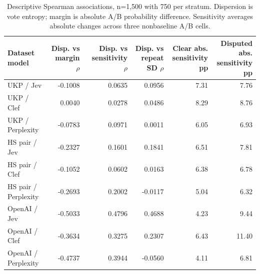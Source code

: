 \begin{table}[t]
\centering\footnotesize
\setlength{\tabcolsep}{3.5pt}
\begin{tabular}{@{}lrrrrr@{}}
\toprule
\shortstack[l]{Dataset\\{}model} & \shortstack[l]{Disp. vs\\{}margin $\rho$} & \shortstack[l]{Disp. vs\\{}sensitivity $\rho$} & \shortstack[l]{Disp. vs\\{}repeat SD $\rho$} & \shortstack[l]{Clear abs.\\{}sensitivity pp} & \shortstack[l]{Disputed abs.\\{}sensitivity pp} \\
\midrule
UKP / Jev & -0.1008 & 0.0635 & 0.0956 & 7.31 & 7.76 \\
UKP / Clef & 0.0040 & 0.0278 & 0.0486 & 8.29 & 8.76 \\
UKP / Perplexity & -0.0783 & 0.0971 & 0.0011 & 6.05 & 6.93 \\
HS pair / Jev & -0.2327 & 0.1601 & 0.1841 & 6.51 & 7.81 \\
HS pair / Clef & -0.1052 & 0.0602 & 0.0163 & 6.38 & 6.78 \\
HS pair / Perplexity & -0.2693 & 0.2002 & -0.0117 & 5.04 & 6.32 \\
OpenAI / Jev & -0.5033 & 0.4796 & 0.4688 & 4.23 & 9.44 \\
OpenAI / Clef & -0.3634 & 0.3275 & 0.2307 & 6.43 & 11.40 \\
OpenAI / Perplexity & -0.4737 & 0.3944 & -0.0560 & 4.11 & 6.81 \\
\bottomrule
\end{tabular}
\caption{Descriptive Spearman associations, n=1,500 with 750 per stratum. Dispersion is vote entropy; margin is absolute A/B probability difference. Sensitivity averages absolute changes across three nonbaseline A/B cells.}
\label{tab:appendix_disagreement_pair}
\end{table}
